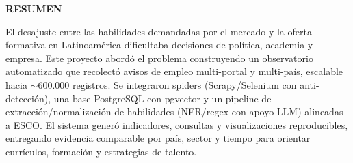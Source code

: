 \thispagestyle{fancy}

\begin{center}
    {\large\bfseries RESUMEN}
\end{center}

\vspace{1cm}

El desajuste entre las habilidades demandadas por el mercado y la oferta formativa en Latinoamérica dificultaba decisiones de política, academia y empresa. Este proyecto abordó el problema construyendo un observatorio automatizado que recolectó avisos de empleo multi-portal y multi-país, escalable hacia $\sim$600.000 registros. Se integraron spiders (Scrapy/Selenium con anti-detección), una base PostgreSQL con pgvector y un pipeline de extracción/normalización de habilidades (NER/regex con apoyo LLM) alineadas a ESCO. El sistema generó indicadores, consultas y visualizaciones reproducibles, entregando evidencia comparable por país, sector y tiempo para orientar currículos, formación y estrategias de talento.
